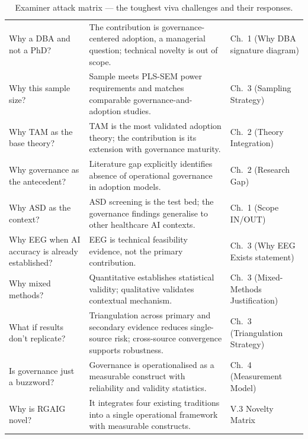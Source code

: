 {\tablestripes\tablefontsize
{}
\begin{xltabular}{\textwidth}{@{} >{\raggedright\arraybackslash}p{4.8cm} >{\raggedright\arraybackslash}p{5.5cm} L @{}}
\caption[Examiner attack matrix]{Examiner attack matrix --- the toughest viva challenges and their responses.}\label{tab:dist_attack_matrix} \\
\toprule
{} &  &  \\
\midrule
\endfirsthead
\endhead
\bottomrule
\endlastfoot
Why a DBA and not a PhD? & The contribution is governance-centered adoption, a managerial question; technical novelty is out of scope. & Ch.~1 (Why DBA signature diagram) \\
\addlinespace
Why this sample size? & Sample meets PLS-SEM power requirements and matches comparable governance-and-adoption studies. & Ch.~3 (Sampling Strategy) \\
\addlinespace
Why TAM as the base theory? & TAM is the most validated adoption theory; the contribution is its extension with governance maturity. & Ch.~2 (Theory Integration) \\
\addlinespace
Why governance as the antecedent? & Literature gap explicitly identifies absence of operational governance in adoption models. & Ch.~2 (Research Gap) \\
\addlinespace
Why ASD as the context? & ASD screening is the test bed; the governance findings generalise to other healthcare AI contexts. & Ch.~1 (Scope IN/OUT) \\
\addlinespace
Why EEG when AI accuracy is already established? & EEG is technical feasibility evidence, not the primary contribution. & Ch.~3 (Why EEG Exists statement) \\
\addlinespace
Why mixed methods? & Quantitative establishes statistical validity; qualitative validates contextual mechanism. & Ch.~3 (Mixed-Methods Justification) \\
\addlinespace
What if results don't replicate? & Triangulation across primary and secondary evidence reduces single-source risk; cross-source convergence supports robustness. & Ch.~3 (Triangulation Strategy) \\
\addlinespace
Is governance just a buzzword? & Governance is operationalised as a measurable construct with reliability and validity statistics. & Ch.~4 (Measurement Model) \\
\addlinespace
Why is RGAIG novel? & It integrates four existing traditions into a single operational framework with measurable constructs. & V.3 Novelty Matrix \\
\end{xltabular}}


